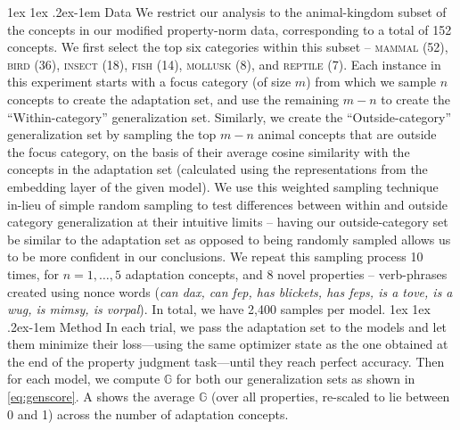 \documentclass[10pt,letterpaper]{article}
\makeatletter
\renewcommand{\paragraph}{%
  \@startsection{paragraph}{4}%
  {\z@}{1ex \@plus 1ex \@minus .2ex}{-1em}%
  {\normalfont\normalsize\bfseries}%
}
\makeatother
\begin{document}
\paragraph{Data} We restrict our analysis to the animal-kingdom subset of the concepts in our modified property-norm data, corresponding to a total of 152 concepts.
We first select the top six categories within this subset -- \textsc{mammal} (52), \textsc{bird} (36), \textsc{insect} (18), \textsc{fish} (14), \textsc{mollusk} (8), and \textsc{reptile} (7).
Each instance in this experiment starts with a focus category (of size $m$) from which we sample $n$ concepts to create the adaptation set, and use the remaining $m-n$ to create the ``Within-category'' generalization set.
Similarly, we create the ``Outside-category'' generalization set by sampling the top $m-n$ animal concepts that are outside the focus category, on the basis of their average cosine similarity with the concepts in the adaptation set (calculated using the representations from the embedding layer of the given model). We use this weighted sampling technique in-lieu of simple random sampling to test differences between within and outside category generalization at their intuitive limits -- 
having our outside-category set be similar to the adaptation set as opposed to being randomly sampled allows us to be more confident in our conclusions.
We repeat this sampling process 10 times, for $n = 1, \dots, 5$ adaptation concepts, and 8 novel properties -- verb-phrases created using nonce words (\textit{can dax, can fep, has blickets, has feps, is a tove, is a wug, is mimsy, is vorpal}). In total, we have 2{,}400 samples per model.
\paragraph{Method}
In each trial, we pass the adaptation set to the models and let them minimize their loss---using the same optimizer state as the one obtained at the end of the property judgment task---until they reach perfect accuracy. Then for each model, we compute $\mathbb{G}$ for both our generalization sets as shown in \cref{eq:genscore}. 
A shows the average $\mathbb{G}$ (over all properties, re-scaled to lie between 0 and 1) across the number of adaptation concepts.
\end{document}
